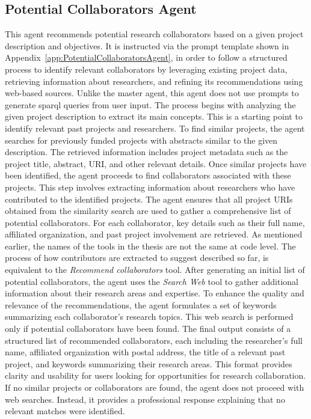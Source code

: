\subsection*{Potential Collaborators Agent}
This agent recommends potential research collaborators based on a given project description and objectives.
It is instructed via the prompt template shown in Appendix~\ref{app:PotentialCollaboratorsAgent}, in order to follow a structured process to identify relevant collaborators by leveraging existing project data, retrieving information about researchers, and refining its recommendations using web-based sources.
Unlike the master agent, this agent does not use prompts to generate \gls{sparql} queries from user input.
The process begins with analyzing the given project description to extract its main concepts.
This is a starting point to identify relevant past projects and researchers.
To find similar projects, the agent searches for previously funded projects with abstracts similar to the given description.
The retrieved information includes project metadata such as the project title, abstract, URI, and other relevant details.
Once similar projects have been identified, the agent proceeds to find collaborators associated with these projects.
This step involves extracting information about researchers who have contributed to the identified projects.
The agent ensures that all project URIs obtained from the similarity search are used to gather a comprehensive list of potential collaborators.
For each collaborator, key details such as their full name, affiliated organization, and past project involvement are retrieved.
As mentioned earlier, the names of the tools in the thesis are not the same at code level.
The process of how contributors are extracted to suggest described so far, is equivalent to the \textit{Recommend collaborators} tool.
After generating an initial list of potential collaborators, the agent uses the \textit{Search Web} tool to gather additional information about their research areas and expertise.
To enhance the quality and relevance of the recommendations, the agent formulates a set of keywords summarizing each collaborator's research topics.
This web search is performed only if potential collaborators have been found.
The final output consists of a structured list of recommended collaborators, each including the researcher's full name, affiliated organization with postal address, the title of a relevant past project, and keywords summarizing their research areas.
This format provides clarity and usability for users looking for opportunities for research collaboration.
If no similar projects or collaborators are found, the agent does not proceed with web searches.
Instead, it provides a professional response explaining that no relevant matches were identified.

